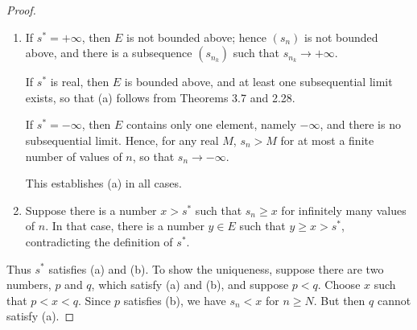 \begin{proof}
\begin{enumerate}[label=(\alph*), leftmargin=2.2em, itemsep=4pt, topsep=3pt]
  \item If $s^* = +\infty$, then $E$ is not bounded above; hence $(s_n)$ is
        not bounded above, and there is a subsequence $(s_{n_k})$ such that
        $s_{n_k} \to +\infty$.

        If $s^*$ is real, then $E$ is bounded above, and at least one
        subsequential limit exists, so that (a) follows from Theorems 3.7 and
        2.28.

        If $s^* = -\infty$, then $E$ contains only one element, namely
        $-\infty$, and there is no subsequential limit. Hence, for any real
        $M$, $s_n > M$ for at most a finite number of values of $n$, so that
        $s_n \to -\infty$.

        This establishes (a) in all cases.
  \item Suppose there is a number $x > s^*$ such that $s_n \ge x$ for
        infinitely many values of $n$. In that case, there is a number
        $y \in E$ such that $y \ge x > s^*$, contradicting the definition of
        $s^*$.
\end{enumerate}
Thus $s^*$ satisfies (a) and (b). To show the uniqueness, suppose there are
two numbers, $p$ and $q$, which satisfy (a) and (b), and suppose $p < q$.
Choose $x$ such that $p < x < q$. Since $p$ satisfies (b), we have $s_n < x$
for $n \ge N$. But then $q$ cannot satisfy (a).
\end{proof}

